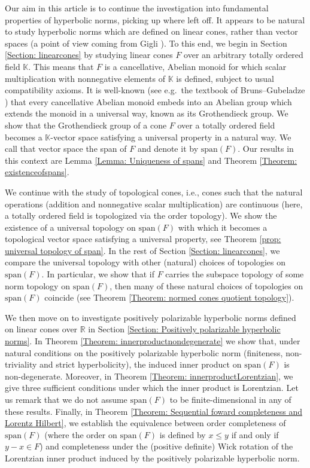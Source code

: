 \documentclass[a4paper,11pt]{article}
\numberwithin{equation}{section}
\theoremstyle{definition}
\theoremstyle{plain}
\newcommand{\R}{\mathbb R}
\newcommand{\spn}{\mathrm{span}}
\begin{document}
Our aim in this article is to continue the investigation into fundamental properties of hyperbolic norms, picking up where \cite[App.\ A.3]{beran2024nonlinear} left off. It appears to be natural to study hyperbolic norms which are defined on linear cones, rather than vector spaces (a point of view coming from Gigli \cite{gigli2025hyperbolic2}). To this end, we begin in Section \ref{Section: linearcones} by studying linear cones $F$ over an arbitrary totally ordered field $\mathbb{K}$. This means that $F$ is a cancellative, Abelian monoid for which scalar multiplication with nonnegative elements of $\mathbb{K}$ is defined, subject to usual compatibility axioms. It is well-known (see e.g.\ the textbook of Bruns--Gubeladze \cite[p.\ 50]{BrunsGubeladze}) that every cancellative Abelian monoid embeds into an Abelian group which extends the monoid in a universal way, known as its Grothendieck group. We show that the Grothendieck group of a cone $F$ over a totally ordered field becomes a $\mathbb{K}$-vector space satisfying a universal property in a natural way. We call that vector space the span of $F$ and denote it by $\spn(F)$. Our results in this context are Lemma \ref{Lemma: Uniqueness of spans} and Theorem \ref{Theorem: existenceofspans}.

We continue with the study of topological cones, i.e., cones such that the natural operations (addition and nonnegative scalar multiplication) are continuous (here, a totally ordered field is topologized via the order topology). We show the existence of a universal topology on $\spn(F)$ with which it becomes a topological vector space satisfying a universal property, see Theorem \ref{prop: universal topology of span}. In the rest of Section \ref{Section: linearcones}, we compare the universal topology with other (natural) choices of topologies on $\spn(F)$. In particular, we show that if $F$ carries the subspace topology of some norm topology on $\spn(F)$, then many of these natural choices of topologies on $\spn(F)$ coincide (see Theorem \ref{Theorem: normed cones quotient topology}).

We then move on to investigate positively polarizable hyperbolic norms defined on linear cones over $\R$ in Section \ref{Section: Positively polarizable hyperbolic norms}. In Theorem \ref{Theorem: innerproductnondegenerate} we show that, under natural conditions on the positively polarizable hyperbolic norm (finiteness, non-triviality and strict hyperbolicity), the induced inner product on $\spn(F)$ is non-degenerate. Moreover, in Theorem \ref{Theorem: innerproductLorentzian}, we give three sufficient conditions under which the inner product is Lorentzian. Let us remark that we do not assume $\spn(F)$ to be finite-dimensional in any of these results. Finally, in Theorem \ref{Theorem: Sequential foward completeness and Lorentz Hilbert}, we establish the equivalence between order completeness of $\spn(F)$ (where the order on $\spn(F)$ is defined by $x \leq y$ if and only if $y - x \in F$) and completeness under the (positive definite) Wick rotation of the Lorentzian inner product induced by the positively polarizable hyperbolic norm.
\end{document}

